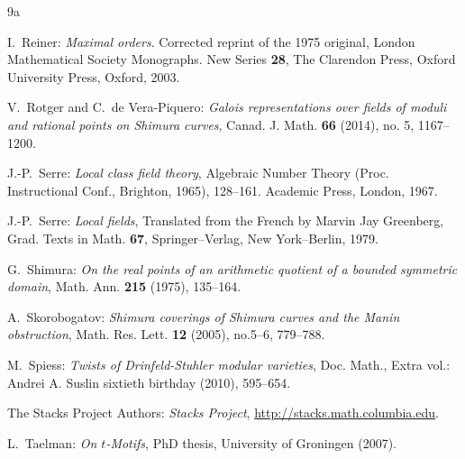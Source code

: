 \documentclass[10pt]{amsart}
\theoremstyle{plain}
\theoremstyle{definition}
\begin{document}
\begin{thebibliography}{9a}

I.~Reiner: 
\emph{Maximal orders}. Corrected reprint of the 1975 original, 
London Mathematical Society Monographs. New Series \textbf{28}, The Clarendon Press, Oxford University Press, Oxford, 2003. 


V.~Rotger and C.~de Vera-Piquero:
\emph{Galois representations over fields of moduli and rational points on Shimura curves},
Canad. J. Math. \textbf{66} (2014), no. 5, 1167--1200.




J.-P.~Serre:
\emph{Local class field theory}, Algebraic Number Theory (Proc. Instructional Conf., Brighton, 1965), 128--161.
Academic Press, London, 1967.

J.-P.~Serre:
\emph{Local fields},
Translated from the French by Marvin Jay Greenberg,
Grad. Texts in Math. \textbf{67},
Springer--Verlag, New York--Berlin, 1979.

G.~Shimura:
\emph{On the real points of an arithmetic quotient of a bounded symmetric domain},
Math. Ann. \textbf{215} (1975), 135--164.

A.~Skorobogatov:
\emph{Shimura coverings of Shimura curves and the Manin obstruction},
Math. Res. Lett. \textbf{12} (2005), no.5--6, 779--788.

M.~Spiess:
\emph{Twists of Drinfeld-Stuhler modular varieties},
Doc. Math., Extra vol.: Andrei A. Suslin sixtieth birthday (2010), 595--654.

The Stacks Project Authors:
\emph{Stacks Project}, \url{http://stacks.math.columbia.edu}.

L.~Taelman:
\emph{On $t$-Motifs}, PhD thesis, University of Groningen (2007).


\end{thebibliography}
\end{document}
